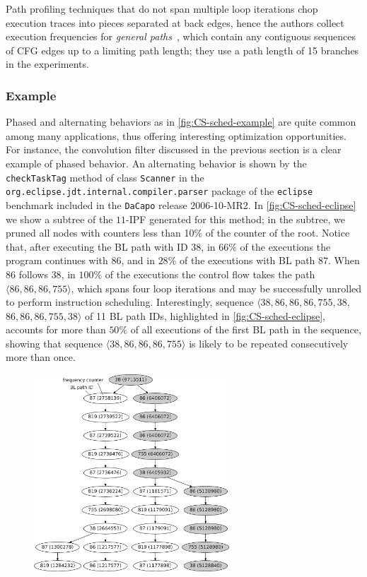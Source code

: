 \noindent Path profiling techniques that do not span multiple loop iterations chop execution traces into pieces separated at back edges, hence the authors collect execution frequencies for {\em general paths}~\cite{Young98thesis}, which contain any contiguous sequences of CFG edges up to a limiting path length; they use a path length of 15 branches in the experiments.

\subsubsection*{Example}
Phased and alternating behaviors as in \myfigure\ref{fig:CS-sched-example} are quite common among many applications, thus offering interesting optimization opportunities. For instance, the convolution filter discussed in the previous section is a clear example of phased behavior. An alternating behavior is shown by the {\tt checkTaskTag} method of class {\tt Scanner} in the {\tt org.eclipse.jdt.internal.compiler.parser} package of the {\tt eclipse} benchmark included in the {\tt DaCapo} release 2006-10-MR2. In \myfigure\ref{fig:CS-sched-eclipse} we show a subtree of the $11$-IPF generated for this method; in the subtree, we pruned all nodes with counters less than 10\% of the counter of the root. Notice that, after executing the BL path with ID $38$, in $66\%$ of the executions the program continues with $86$, and in $28\%$ of the executions with BL path $87$. When $86$ follows $38$, in $100\%$ of the executions the control flow takes the path $\langle 86, 86, 86, 755\rangle$, which spans four loop iterations and may be successfully unrolled to perform instruction scheduling. Interestingly, sequence $\langle 38, 86, 86, 86, 755, 38,$ $86, 86, 86, 755, 38\rangle$ of 11 BL path IDs, highlighted in \myfigure\ref{fig:CS-sched-eclipse}, accounts for more than $50\%$ of all executions of the first BL path in the sequence, showing that sequence $\langle 38, 86, 86, 86, 755\rangle$ is likely to be repeated consecutively more than once.

\ifdefined\noauthorea
\begin{figure}[!ht]
\begin{center}
\includegraphics[width=0.65\textwidth]{figures/CS-sched-eclipse/CS-sched-eclipse.eps}
\caption{\protect}
\end{center}
\end{figure}
\fi


